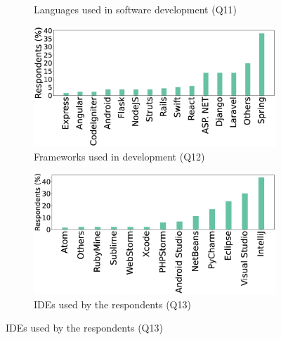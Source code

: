 \begin{figure}[t]
\begin{subfigure}{0.45\textwidth}
          \caption{Languages used in software development (Q11)}
          \label{fig:languages}
    \end{subfigure}
    \begin{subfigure}{0.45\textwidth}
          \includegraphics[scale=0.10]{Figures/Respondents_frameworks}
          \caption{Frameworks used in development (Q12)}
          \label{fig:frameworks}
    \end{subfigure}
    \begin{subfigure}{0.6\textwidth}
          \includegraphics[scale=0.12]{Figures/Respondents_IDEs}
          \caption{IDEs used by the respondents (Q13)}
          \label{fig:IDEs}
    \end{subfigure}
\end{figure}


